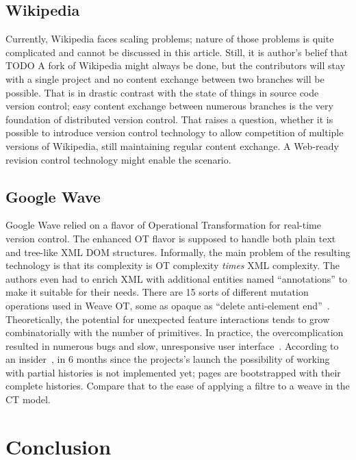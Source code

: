 \documentclass{acm_proc_article-sp}
\begin{document}
\subsection{Wikipedia}

Currently, Wikipedia faces scaling problems; nature of those
problems is quite complicated and cannot be discussed in this
article. Still, it is author's belief that TODO
A fork of Wikipedia might always be done, but the contributors
will stay with a single project and no content exchange between
two branches will be possible. That is in drastic contrast with
the state of things in source code version control; easy content
exchange between numerous branches is the very foundation of
distributed version control. That raises a question, whether it
is possible to introduce version control technology to allow
competition of multiple versions of Wikipedia, still maintaining
regular content exchange. A Web-ready revision control technology
might enable the scenario.

\subsection{Google Wave}  \label{sec:waveot}

Google Wave relied on a flavor of Operational Transformation for
real-time version control. The enhanced OT flavor is supposed to
handle both plain text and tree-like XML DOM structures.
Informally, the main problem of the resulting technology is that
its complexity is OT complexity \emph{times} XML complexity. 
The authors even had to enrich XML with additional entities 
named ``annotations'' to make it suitable for their needs.
There are 15 sorts of different mutation operations used in Weave
OT, some as opaque as ``delete anti-element end''~\cite{waveot}.
Theoretically, the potential for unexpected feature interactions
tends to grow combinatorially with the number of primitives.
In practice, the overcomplication resulted in numerous bugs and
slow, unresponsive user interface~\cite{own-experience}.
According to an insider~\cite{gerasimov}, in 6 months since the
projects's launch the possibility of working with partial
histories is not  implemented yet; pages are bootstrapped with
their complete histories. Compare that to the ease of applying
a filtre to a weave in the CT model.


\section {Conclusion}
\end{document}
